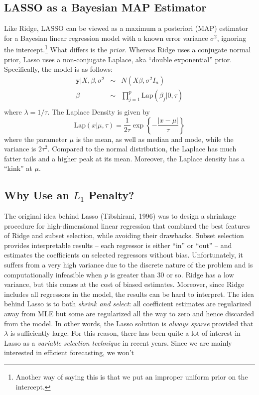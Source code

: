\documentclass[12pt]{article}
\theoremstyle{definition}
\begin{document}
\subsection{LASSO as a Bayesian MAP Estimator}
Like Ridge, LASSO can be viewed as a maximum a posteriori (MAP) estimator for a Bayesian linear regression model with a known error variance $\sigma^2$, ignoring the intercept.\footnote{Another way of saying this is that we put an improper uniform prior on the intercept.} What differs is the \emph{prior}. Whereas Ridge uses a conjugate normal prior, Lasso uses a non-conjugate Laplace, aka ``double exponential'' prior. Specifically, the model is as follows:
	\begin{eqnarray*}
		\mathbf{y}|X,\beta, \sigma^2 &\sim& N(X\beta,\sigma^2 I_n)\\
		\beta&\sim& \prod_{j=1}^p \mbox{Lap}(\beta_j|0, \tau)\\
	\end{eqnarray*}
where $\lambda = 1/\tau$. The Laplace Density is given by
	$$\mbox{Lap}(x|\mu,\tau)= \frac{1}{2\tau}\exp\left
	\{-\frac{|x-\mu|}{\tau} \right\}$$
where the parameter $\mu$ is the mean, as well as median and mode, while the variance is $2\tau^2$. Compared to the normal distribution, the Laplace has much fatter tails and a higher peak at its mean. Moreover, the Laplace density has a ``kink'' at $\mu$.


\subsection{Why Use an $L_1$ Penalty?}
The original idea behind Lasso (Tibshirani, 1996) was to design a shrinkage procedure for high-dimensional linear regression that combined the best features of Ridge and subset selection, while avoiding their drawbacks. Subset selection provides interpretable results -- each regressor is either ``in'' or ``out'' -- and estimates the coefficients on selected regressors without bias. Unfortunately, it suffers from a very high variance due to the discrete nature of the problem and is computationally infeasible when $p$ is greater than 30 or so. Ridge has a low variance, but this comes at the cost of biased estimates. Moreover, since Ridge includes all regressors in the model, the results can be hard to interpret. The idea behind Lasso is to both \emph{shrink and select}: all coefficient estimates are regularized away from MLE but some are regularized all the way to zero and hence discarded from the model. In other words, the Lasso solution is \emph{always sparse} provided that $\lambda$ is sufficiently large. For this reason, there has been quite a lot of interest in Lasso as a \emph{variable selection technique} in recent years. Since we are mainly interested in efficient forecasting, we won't 
\end{document}
